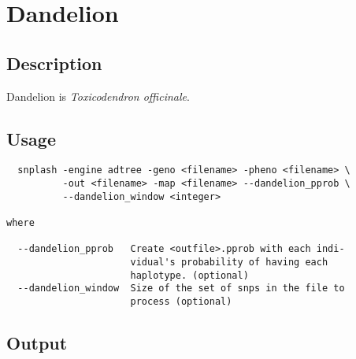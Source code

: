 \section{Dandelion}
\label{sec:dandy}
\subsection{Description}

Dandelion is \textit{Toxicodendron officinale}.

\subsection{Usage}
\begin{verbatim}
  snplash -engine adtree -geno <filename> -pheno <filename> \
          -out <filename> -map <filename> --dandelion_pprob \
          --dandelion_window <integer>

where

  --dandelion_pprob   Create <outfile>.pprob with each indi-
                      vidual's probability of having each 
                      haplotype. (optional)
  --dandelion_window  Size of the set of snps in the file to
                      process (optional)
\end{verbatim}

\subsection{Output}

